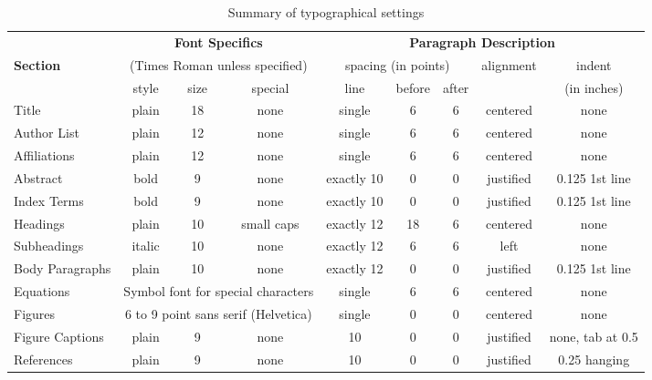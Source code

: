 \documentclass[10pt,conference,letterpaper]{RWWTemplate}
\begin{document}
\begin{table*}[htbp]
\centering
\renewcommand{\arraystretch}{1.4}
    \caption{Summary of typographical settings}
    \label{tab:font-sizes}

    \begin{small}
    \begin{tabular}{|l|c|c|c|c|c|c|c|c|}
    \hline
     & \multicolumn{3}{|c|}{\bfseries Font
    Specifics} & \multicolumn{5}{|c|}{\bfseries Paragraph Description}
    \\ 

    {\bfseries Section} & \multicolumn{3}{|c|}{(Times Roman unless
    specified)} & \multicolumn{3}{|c|}{spacing (in points)} &
    alignment & indent \\

    & style & size & special & line & before & after & & (in inches)
    \\ \hline

    Title & plain & 18 & none & single & 6 & 6 & centered & none \\
    \hline

    Author List & plain & 12 & none & single & 6 & 6 & centered & none
    \\ \hline

    Affiliations & plain & 12 & none & single & 6 & 6 & centered &
    none \\ \hline

    Abstract & bold & 9 & none & exactly 10 & 0 & 0 & justified &
    0.125 1st line \\ \hline

    Index Terms & bold & 9 & none & exactly 10 & 0 & 0 & justified &
    0.125 1st line \\ \hline

    Headings & plain & 10 & small caps & exactly 12 & 18 & 6 &
    centered & none \\ \hline

    Subheadings & italic & 10 & none & exactly 12 & 6 & 6 & left &
    none \\ \hline

    Body Paragraphs & plain & 10 & none & exactly 12 & 0 & 0 &
    justified & 0.125 1st line \\ \hline

    Equations & \multicolumn{3}{|c|}{Symbol font for special
    characters} & single & 6 & 6 & centered & none \\ \hline

    Figures & \multicolumn{3}{|c|}{6 to 9 point sans serif
    (Helvetica)} & single & 0 & 0 & centered & none \\ \hline

    Figure Captions & plain & 9 & none & 10 & 0 & 0 & justified &
    none, tab at 0.5 \\ \hline

    References & plain & 9 & none & 10 & 0 & 0 & justified & 0.25
    hanging \\ \hline

    \end{tabular}
    \end{small} 
\end{table*}
\end{document}
